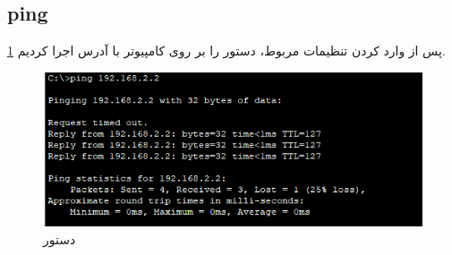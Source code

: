 \documentclass{perassignments}
\begin{document}
 	\subsection{ping}
 	پس از وارد کردن تنظیمات مربوط، دستور 
 	را بر روی کامپیوتر با آدرس 
 	اجرا کردیم
 	\ref{fig:n}.
 	 	\begin{figure}[H]
 		\centering
 		\includegraphics[width= 0.7\linewidth]{graphics/n.png}
 		\caption{
 			دستور	
 			 }
 		\label{fig:n}
 	\end{figure}
\end{document}
